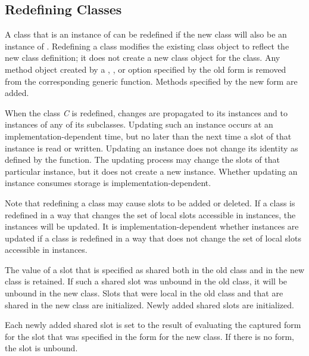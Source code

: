\subsection{Redefining Classes}  
\label{Redefining-Classes-SECTION}  

A class that is an instance of  can be redefined
if the new class will also be an instance of .
Redefining a class modifies the existing class object to reflect the
new class definition; it does not create a new class object for the
class.  Any method object created by a , , or
 option specified by the old  form is
removed from the corresponding generic function.
Methods specified by the new  form are added.


When the class {\it C} is redefined, changes are propagated to its instances
and to instances of any of its subclasses.  Updating such an
instance occurs at an implementation-dependent time, but no later than
the next time a slot of that instance is read or written.  Updating an
instance does not change its identity as defined by the 
function.  The updating process may change the slots of that
particular instance, but it does not create a new instance.  Whether
updating an instance consumes storage is implementation-dependent.

Note that redefining a class may cause slots to be added or deleted.
If a class is redefined in a way that changes the set of local slots
accessible in instances, the instances will be updated.  It is
implementation-dependent whether instances are updated if a class is
redefined in a way that does not change the set of local slots
accessible in instances.

The value of a slot that is specified as shared both in the old class
and in the new class is retained.  If such a shared slot was unbound
in the old class, it will be unbound in the new class.  Slots that
were local in the old class and that are shared in the new class are
initialized.  Newly added shared slots are initialized.

Each newly added shared slot is set to the result of evaluating the
captured  form for the slot that was specified in the
 form for the new class. If there is no 
form, the slot is unbound.

